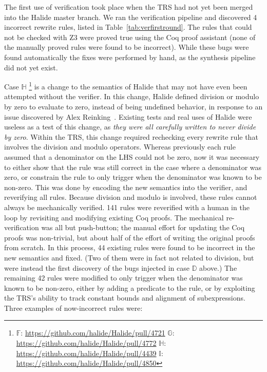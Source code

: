 \documentclass[acmsmall,review]{acmart}\settopmatter{printfolios=true,printccs=false,printacmref=false}
\newcommand{\NumRulesFixed}{{\color{black} 4}\xspace}
\newcommand{\NumZdivCoqProvedRules}{{\color{black} 141}\xspace}
\newcommand{\NumZdivFalseRules}{{\color{black} 44}\xspace}
\begin{document}
The first use of verification took place when the TRS had not yet been merged into the Halide master branch. We ran the verification pipeline and discovered \NumRulesFixed incorrect rewrite rules, listed in Table~\ref{tab:verfirstround}. The rules that could not be checked with Z3 were proved true using the Coq proof assistant (none of the manually proved rules were found to be incorrect). While these bugs were found automatically the fixes were performed by hand, as the synthesis pipeline did not yet exist. 

Case $\mathbb{H}$
\footnote{
\label{footnote:casesfi}
$\mathbb{F}$: \url{https://github.com/halide/Halide/pull/4721}
$\mathbb{G}$: \url{https://github.com/halide/Halide/pull/4772}
$\mathbb{H}$: \url{https://github.com/halide/Halide/pull/4439} %
$\mathbb{I}$: \url{https://github.com/halide/Halide/pull/4850}
}
is a change to the semantics of Halide that may not have even been attempted without the verifier. In this change, Halide defined division or modulo by zero to evaluate to zero, instead of being undefined behavior, in response to an issue discovered by Alex Reinking~\cite{reinkingthesis}. Existing tests and real uses of Halide were useless as a test of this change, as \emph{they were all carefully written to never divide by zero}. Within the TRS, this change required rechecking every rewrite rule that involves the division and modulo operators. Whereas previously each rule assumed that a denominator on the LHS could not be zero, now it was necessary to either show that the rule was still correct in the case where a denominator was zero, or constrain the rule to only trigger when the denominator was known to be non-zero. This was done by encoding the new semantics into the verifier, and reverifying all rules. Because division and modulo is involved, these rules cannot always be mechanically verified. 
\NumZdivCoqProvedRules rules were reverified with a human in the loop by revisiting and modifying existing Coq proofs. The mechanical re-verification was all but push-button; the manual effort for updating the Coq proofs was non-trivial, but about half of the effort of writing the original proofs from scratch. In this process, \NumZdivFalseRules existing rules were found to be incorrect in the new semantics and fixed. (Two of them were in fact not related to division, but were instead the first discovery of the bugs injected in case $\mathbb{D}$ above.) The remaining 42 rules were modified to only trigger when the denominator was known to be non-zero, either by adding a predicate to the rule, or by exploiting the TRS’s ability to track constant bounds and alignment of subexpressions. Three examples of now-incorrect rules were:
\end{document}
